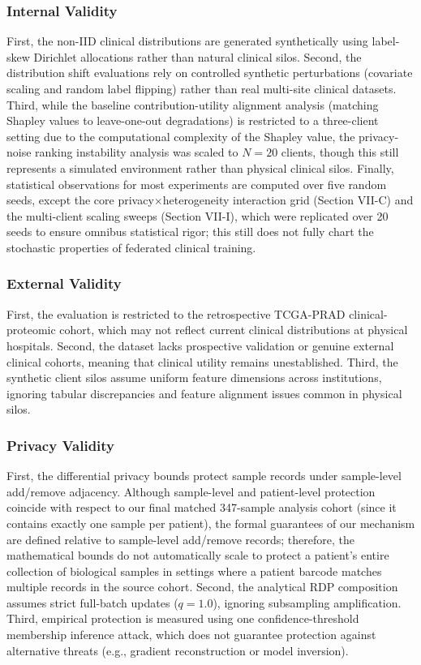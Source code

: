 \documentclass[conference]{IEEEtran}
\begin{document}
\subsubsection{Internal Validity}
First, the non-IID clinical distributions are generated synthetically using label-skew Dirichlet allocations rather than natural clinical silos. Second, the distribution shift evaluations rely on controlled synthetic perturbations (covariate scaling and random label flipping) rather than real multi-site clinical datasets. Third, while the baseline contribution-utility alignment analysis (matching Shapley values to leave-one-out degradations) is restricted to a three-client setting due to the computational complexity of the Shapley value, the privacy-noise ranking instability analysis was scaled to $N=20$ clients, though this still represents a simulated environment rather than physical clinical silos. Finally, statistical observations for most experiments are computed over five random seeds, except the core privacy$\times$heterogeneity interaction grid (Section VII-C) and the multi-client scaling sweeps (Section VII-I), which were replicated over 20 seeds to ensure omnibus statistical rigor; this still does not fully chart the stochastic properties of federated clinical training.

\subsubsection{External Validity}
First, the evaluation is restricted to the retrospective TCGA-PRAD clinical-proteomic cohort, which may not reflect current clinical distributions at physical hospitals. Second, the dataset lacks prospective validation or genuine external clinical cohorts, meaning that clinical utility remains unestablished. Third, the synthetic client silos assume uniform feature dimensions across institutions, ignoring tabular discrepancies and feature alignment issues common in physical silos.

\subsubsection{Privacy Validity}
First, the differential privacy bounds protect sample records under sample-level add/remove adjacency. Although sample-level and patient-level protection coincide with respect to our final matched 347-sample analysis cohort (since it contains exactly one sample per patient), the formal guarantees of our mechanism are defined relative to sample-level add/remove records; therefore, the mathematical bounds do not automatically scale to protect a patient's entire collection of biological samples in settings where a patient barcode matches multiple records in the source cohort. Second, the analytical RDP composition assumes strict full-batch updates ($q=1.0$), ignoring subsampling amplification. Third, empirical protection is measured using one confidence-threshold membership inference attack, which does not guarantee protection against alternative threats (e.g., gradient reconstruction or model inversion).
\end{document}
